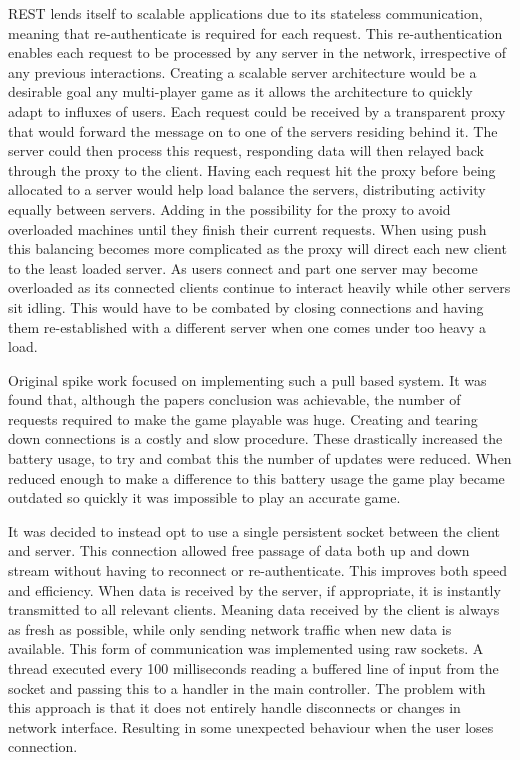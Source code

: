 REST lends itself to scalable applications due to its stateless communication, meaning that re-authenticate is required for each request. This re-authentication enables each request to be processed by any server in the network, irrespective of any previous interactions. Creating a scalable server architecture would be a desirable goal any multi-player game as it allows the architecture to quickly adapt to influxes of users. Each request could be received by a transparent proxy that would forward the message on to one of the servers residing behind it. The server could then process this request, responding data will then relayed back through the proxy to the client. Having each request hit the proxy before being allocated to a server would help load balance the servers, distributing activity equally between servers. Adding in the possibility for the proxy to avoid overloaded machines until they finish their current requests. When using push this balancing becomes more complicated as the proxy will direct each new client to the least loaded server. As users connect and part one server may become overloaded as its connected clients continue to interact heavily while other servers sit idling. This would have to be combated by closing connections and having them re-established with a different server when one comes under too heavy a load.

Original spike work focused on implementing such a pull based system. It was found that, although the papers conclusion was achievable, the number of requests required to make the game playable was huge. Creating and tearing down connections is a costly and slow procedure. These drastically increased the battery usage, to try and combat this the number of updates were reduced. When reduced enough to make a difference to this battery usage the game play became outdated so quickly it was impossible to play an accurate game.

It was decided to instead opt to use a single persistent socket between the client and server. This connection allowed free passage of data both up and down stream without having to reconnect or re-authenticate. This improves both speed and efficiency. When data is received by the server, if appropriate, it is instantly transmitted to all relevant clients. Meaning data received by the client is always as fresh as possible, while only sending network traffic when new data is available. This form of communication was implemented using raw sockets. A thread executed every 100 milliseconds reading a buffered line of input from the socket and passing this to a handler in the main controller. The problem with this approach is that it does not entirely handle disconnects or changes in network interface. Resulting in some unexpected behaviour when the user loses connection.



